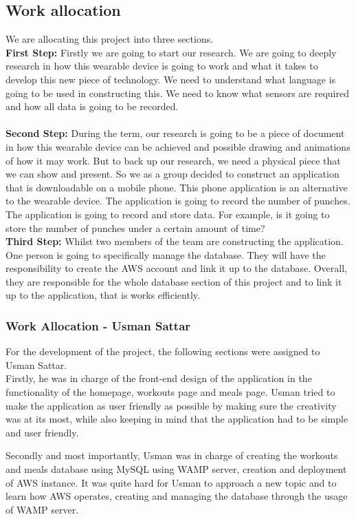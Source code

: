 \documentclass[a4paper,12pt]{report}
\begin{document}
\subsection{Work allocation}
We are allocating this project into three sections.\\
\textbf{First Step:}
Firstly we are going to start our research. We are going to deeply research in how this wearable device is going to work and what it takes to develop this new piece of technology. We need to understand what language is going to be used in constructing this. We need to know what sensors are required and how all data is going to be recorded.\\
\\
\textbf{Second Step:}
During the term, our research is going to be a piece of document in how this wearable device can be achieved and possible drawing and animations of how it may work. But to back up our research, we need a physical piece that we can show and present. So we as a group decided to construct an application that is downloadable on a mobile phone. This phone application is an alternative to the wearable device. The application is going to record the number of punches. The application is going to record and store data. For example, is it going to store the number of punches under a certain amount of time?\\
\newpage
\textbf{Third Step:}
Whilst two members of the team are constructing the application. One person is going to specifically manage the database. They will have the responsibility to create the AWS account and link it up to the database. Overall, they are responsible for the whole database section of this project and to link it up to the application, that is works efficiently.

\subsubsection{Work Allocation - Usman Sattar}
For the development of the project, the following sections were assigned to Usman Sattar.\\
Firstly, he was in charge of the front-end design of the application in the functionality of the homepage, workouts page and meals page. Usman tried to make the application as user friendly as possible by making sure the creativity was at its most, while also keeping in mind that the application had to be simple and user friendly.

Secondly and most importantly, Usman was in charge of creating the workouts and meals database using MySQL using WAMP server, creation and deployment of AWS instance. It was quite hard for Usman to approach a new topic and to learn how AWS operates, creating and managing the database through the usage of WAMP server.
\end{document}
